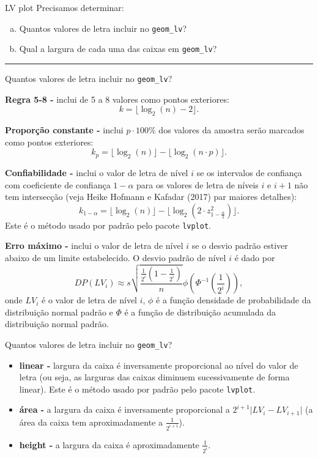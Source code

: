 \documentclass[
  10pt,
  ignorenonframetext,
]{beamer}
\providecommand{\tightlist}{%
  \setlength{\itemsep}{0pt}\setlength{\parskip}{0pt}}\usepackage{longtable,booktabs,array}
\newcommand*{\destaque}[1]{%
    \colorbox{cabecalho}{\textcolor{titulo}{#1}}
}
\newcommand*{\regrafina}{\rule{\textwidth}{0.5pt}}
\begin{document}
\begin{frame}[fragile]{LV plot}
\protect\hypertarget{lv-plot-2}{}
Precisamos determinar:

\begin{enumerate}
[a.]
\tightlist
\item
  Quantos valores de letra incluir no \texttt{geom\_lv}?
\item
  Qual a largura de cada uma das caixas em \texttt{geom\_lv}?
\end{enumerate}

\regrafina

\destaque{Quantos valores de letra incluir no \texttt{geom\_lv}?}

\textbf{Regra 5-8 -} inclui de 5 a 8 valores como pontos exteriores:
\[k = \lfloor \log_2(n) -2 \rfloor.\]

\textbf{Proporção constante -} inclui \(p\cdot 100\%\) dos valores da
amostra serão marcados como pontos exteriores:
\[k_p = \lfloor \log_2(n) \rfloor - \lfloor \log_2(n \cdot p) \rfloor.\]
\end{frame}

\begin{frame}[fragile]
\textbf{Confiabilidade -} inclui o valor de letra de nível \(i\) se os
intervalos de confiança com coeficiente de confiança \(1-\alpha\) para
os valores de letra de níveis \(i\) e \(i+1\) não tem intersecção (veja
Heike Hofmann e Kafadar (2017) par maiores detalhes):
\[k_{1-\alpha} = \lfloor \log_2(n) \rfloor - \lfloor \log_2(2\cdot z_{1-\frac{\alpha}{2}}^2) \rfloor.\]
Este é o método usado por padrão pelo pacote \texttt{lvplot}.

\textbf{Erro máximo -} inclui o valor de letra de nível \(i\) se o
desvio padrão estiver abaixo de um limite estabelecido. O desvio padrão
de nível \(i\) é dado por
\[DP(LV_i) \approx s \sqrt{\frac{\frac{1}{2^i}\left(1 - \frac{1}{2^i}\right)}{n}}\phi\left(\Phi^{-1}\left(\frac{1}{2^i}\right)\right),\]
onde \(LV_i\) é o valor de letra de nível \(i\), \(\phi\) é a função
densidade de probabilidade da distribuição normal padrão e \(\Phi\) é a
função de distribuição acumulada da distribuição normal padrão.
\end{frame}

\begin{frame}[fragile]
\destaque{Quantos valores de letra incluir no \texttt{geom\_lv}?}

\begin{itemize}
\tightlist
\item
  \textbf{linear -} largura da caixa é inversamente proporcional ao
  nível do valor de letra (ou seja, as larguras das caixas diminuem
  sucessivamente de forma linear). Este é o método usado por padrão pelo
  pacote \texttt{lvplot}.
\item
  \textbf{área -} a largura da caixa é inversamente proporcional a
  \(2^{i+1}\lvert LV_i - LV_{i+1} \rvert\) (a área da caixa tem
  aproximadamente a \(\frac{1}{2^{i+1}}\)).
\item
  \textbf{height -} a largura da caixa é aproximadamente
  \(\frac{1}{2^i}\).
\end{itemize}
\end{frame}
\end{document}
